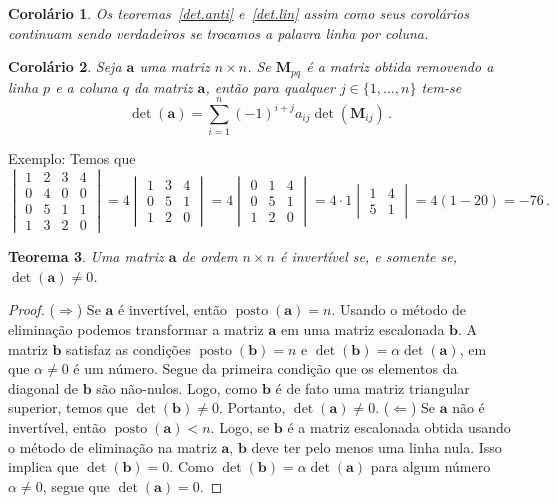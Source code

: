 \documentclass[12pt,a4paper]{report}
\newcommand{\mb}{\mathbf}
\newtheorem{thm}{Teorema}[chapter]
\newtheorem{cor}[thm]{Corolário}
\DeclareMathOperator{\posto}{posto}
\begin{document}
\begin{cor}
  Os teoremas~\ref{det.anti} e~\ref{det.lin} assim como seus corolários continuam sendo verdadeiros se trocamos a palavra linha por coluna.
\end{cor}

\begin{cor}
  Seja $\mb a$ uma matriz $n\times n$. Se $\mb M_{pq}$ é a matriz obtida removendo a linha $p$ e a coluna $q$ da matriz $\mb a$, então para qualquer $j\in\{1,\ldots,n\}$ tem-se
  $$\det(\mb a)=\sum_{i=1}^n(-1)^{i+j}a_{ij}\det(\mb M_{ij})\,.$$
\end{cor}

Exemplo: Temos que
$$\begin{vmatrix}
  1&2&3&4\\
  0&4&0&0\\
  0&5&1&1\\
  1&3&2&0
\end{vmatrix}=4 \begin{vmatrix}
  1&3&4\\
  0&5&1\\
  1&2&0
\end{vmatrix}=4\begin{vmatrix}
  0&1&4\\
  0&5&1\\
  1&2&0
\end{vmatrix}=4\cdot 1 \begin{vmatrix}
  1&4\\
  5&1
\end{vmatrix}=4(1-20)=-76\,.$$

\begin{thm}
  Uma matriz $\mb a$ de ordem $n\times n$ é invertível se, e somente se, $\det(\mb a)\ne 0$.
\end{thm}
\begin{proof}
  ($\Rightarrow$) Se $\mb a$ é invertível, então $\posto(\mb a)=n$. Usando o método de eliminação podemos transformar a matriz $\mb a$ em uma matriz escalonada $\mb b$.
  A matriz $\mb b$ satisfaz as condições $\posto(\mb b)=n$ e $\det(\mb b)=\alpha\det(\mb a)$, em que $\alpha\ne 0$ é um número. Segue da primeira condição que os elementos da diagonal de $\mb b$ são não-nulos. Logo, como $\mb b$ é de fato uma matriz triangular superior, temos que $\det(\mb b)\ne 0$. Portanto, $\det(\mb a)\ne 0$.
  ($\Leftarrow$) Se $\mb a$ não é invertível, então $\posto(\mb a)<n$. Logo, se $\mb b$ é a matriz escalonada obtida usando o método de eliminação na matriz $\mb a$, $\mb b$ deve ter pelo menos uma linha nula. Isso implica que $\det(\mb b)=0$. Como $\det(\mb b)=\alpha\det(\mb a)$ para algum número $\alpha\ne 0$, segue que $\det(\mb a)=0$.
\end{proof}
\end{document}
